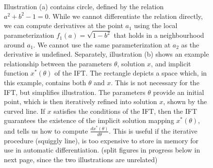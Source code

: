 \documentclass[11pt]{article}
\begin{document}
\begin{figure}
\centering
\begin{subfigure}[b]{0.45\textwidth}
\centering
{}
\caption{}
\end{subfigure}
\begin{subfigure}[b]{0.45\textwidth}
\centering
{}
\caption{}
\end{subfigure}
\caption{
\label{fig:circle}
Illustration (a) contains circle, defined by the relation $a^2 + b^2 - 1 = 0$.
While we cannot differentiate the relation directly,
we can compute derivatives at the point $a_1$ using the local parameterization $f_1(a)=\sqrt{1-b^2}$ that holds
in a neighbourhood around $a_1$.
We cannot use the same parameterization at $a_2$ as the derivative is undefined.
Separately, illustration (b) shows an example relationship between the parameters $\theta$,
solution $x$, and implicit function $x^*(\theta)$ of the IFT.
The rectangle depicts a space which, in this example,
contains both $\theta$ and $x$.
This is not necessary for the IFT, but simplifies illustration.
The parameters $\theta$ provide an initial point, which is then iteratively refined
into solution $x$, shown by the curved line.
If $x$ satisfies the conditions of the IFT, then the IFT guarantees the
existence of the implicit solution mapping $x^*(\theta)$,
and tells us how to compute $\frac{dx^*(\theta)}{d\theta}$.
This is useful if the iterative procedure (squiggly line), is too expensive
to store in memory for use in automatic differentiation.
(split figures in progress below in next page, since the two illustrations are
unrelated)
}
\end{figure}
\end{document}
